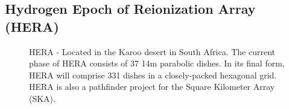 \documentclass[a0,landscape]{a0poster}
\begin{document}
\begin{multicols}{4}

\section*{Hydrogen Epoch of Reionization Array (HERA)}


\begin{figure}[H]
\centering
\label{fig:HERA}
\caption{HERA - Located in the Karoo desert in South Africa. The current phase of HERA consists of 37 14m parabolic dishes. In its final form, HERA will comprise 331 dishes in a closely-packed hexagonal grid. HERA is also a pathfinder project for the Square Kilometer Array (SKA).}
\end{figure}


\end{multicols}
\end{document}
